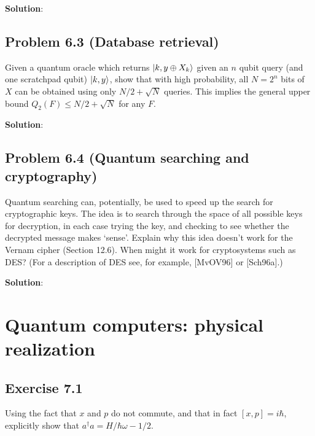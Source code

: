 \documentclass{book}
\begin{document}
        \textbf{Solution}:
    
    \section*{Problem 6.3 (Database retrieval)}
        Given a quantum oracle which returns $\ket{k,y\oplus X_k}$ given an $n$ qubit query (and one scratchpad qubit) $\ket{k,y}$, show that with high probability, all $N=2^n$ bits of $X$ can be obtained using only $N/2 + \sqrt{N}$ queries. This implies the general upper bound $Q_2(F) \leq N/2 +\sqrt{N}$ for any $F$.
        
        \textbf{Solution}:
    
    \section*{Problem 6.4 (Quantum searching and cryptography)}
        Quantum searching can, potentially, be used to speed up the search for cryptographic keys. The idea is to search through the space of all possible keys for decryption, in each case trying the key, and checking to see whether the decrypted message makes ‘sense’. Explain why this idea doesn’t work for the Vernam cipher (Section 12.6). When might it work for cryptosystems such as DES? (For a description of DES see, for example, [MvOV96] or [Sch96a].)
        
        \textbf{Solution}:

\chapter{Quantum computers: physical realization}

\section*{Exercise 7.1}
    Using the fact that $x$ and $p$ do not commute, and that in fact $[x,p]=i\hbar$, explicitly show that $a^\dagger a= H/\hbar\omega -1/2$.
    
\end{document}
